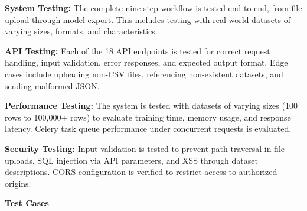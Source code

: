 \documentclass[12pt,a4paper]{report}
\begin{document}
\vspace{0.3cm}

\textbf{System Testing:}
The complete nine-step workflow is tested end-to-end, from file upload through model export. This includes testing with real-world datasets of varying sizes, formats, and characteristics.

\vspace{0.3cm}

\textbf{API Testing:}
Each of the 18 API endpoints is tested for correct request handling, input validation, error responses, and expected output format. Edge cases include uploading non-CSV files, referencing non-existent datasets, and sending malformed JSON.

\vspace{0.3cm}

\textbf{Performance Testing:}
The system is tested with datasets of varying sizes (100 rows to 100,000+ rows) to evaluate training time, memory usage, and response latency. Celery task queue performance under concurrent requests is evaluated.

\vspace{0.3cm}

\textbf{Security Testing:}
Input validation is tested to prevent path traversal in file uploads, SQL injection via API parameters, and XSS through dataset descriptions. CORS configuration is verified to restrict access to authorized origins.

\vspace{0.3cm}

\textbf{Test Cases}
\end{document}
